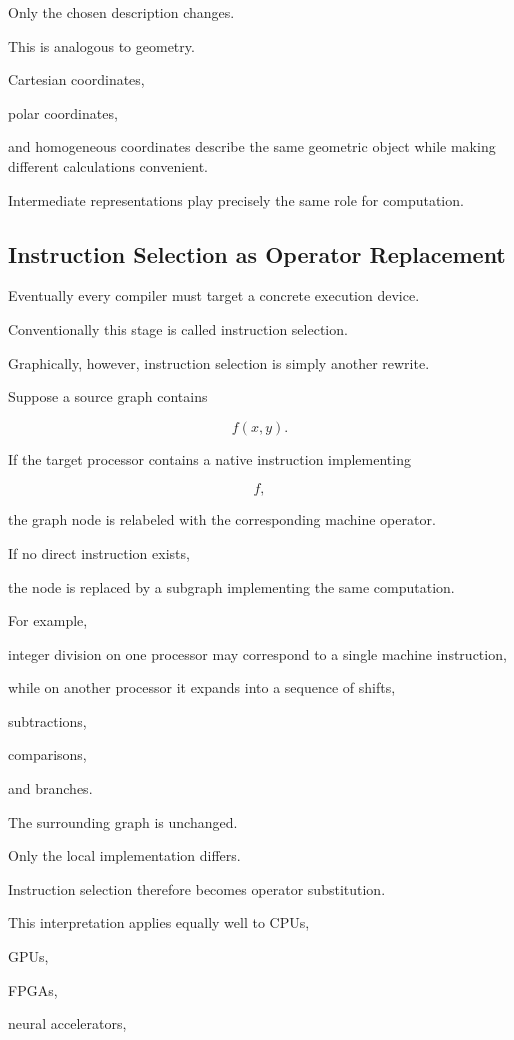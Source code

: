 \documentclass[12pt,oneside]{article}
\begin{document}
Only the chosen description changes.

This is analogous to geometry.

Cartesian coordinates,

polar coordinates,

and homogeneous coordinates describe the same geometric object while making different calculations convenient.

Intermediate representations play precisely the same role for computation.

\subsection{Instruction Selection as Operator Replacement}

Eventually every compiler must target a concrete execution device.

Conventionally this stage is called instruction selection.

Graphically, however, instruction selection is simply another rewrite.

Suppose a source graph contains

\[
f(x,y).
\]

If the target processor contains a native instruction implementing

\[
f,
\]

the graph node is relabeled with the corresponding machine operator.

If no direct instruction exists,

the node is replaced by a subgraph implementing the same computation.

For example,

integer division on one processor may correspond to a single machine instruction,

while on another processor it expands into a sequence of shifts,

subtractions,

comparisons,

and branches.

The surrounding graph is unchanged.

Only the local implementation differs.

Instruction selection therefore becomes operator substitution.

This interpretation applies equally well to CPUs,

GPUs,

FPGAs,

neural accelerators,
\end{document}
